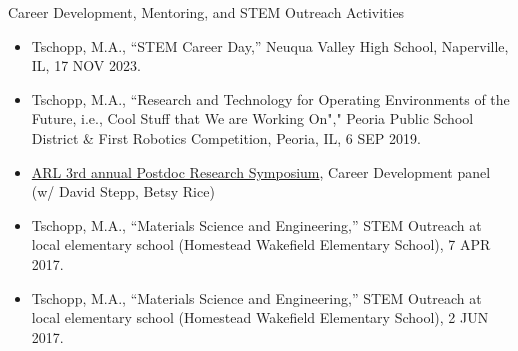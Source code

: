 Career Development, Mentoring, and STEM Outreach Activities
\begin{itemize}
\item Tschopp, M.A., ``STEM Career Day,'' Neuqua Valley High School, Naperville, IL, 17 NOV 2023.
\item Tschopp, M.A., ``Research and Technology for Operating Environments of the Future, i.e., Cool Stuff that We are Working On"," Peoria Public School District \& First Robotics Competition, Peoria, IL, 6 SEP 2019.

\item \href{https://www.army.mil/article/212535/army_lab_recognizes_scientific_contributions_of_postdocs_at_symposium}{ARL 3rd annual Postdoc Research Symposium}, Career Development panel (w/ David Stepp, Betsy Rice)

\item Tschopp, M.A., ``Materials Science and Engineering,'' STEM Outreach at local elementary school (Homestead Wakefield Elementary School), 7 APR 2017.
\item Tschopp, M.A., ``Materials Science and Engineering,'' STEM Outreach at local elementary school (Homestead Wakefield Elementary School), 2 JUN 2017.


\end{itemize}
